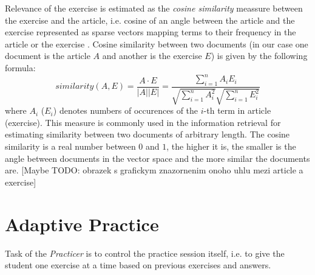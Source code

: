 \documentclass[a4paper, 12pt, twoside]{fithesis2}		%
\renewcommand{\_}{\leavevmode \kern0.07em\vbox{\hrule width0.4em}}
\begin{document}
Relevance of the exercise is estimated as the \textit{cosine similarity} meassure between the exercise and the article,
i.e. cosine of an angle between the article and the exercise represented as sparse vectors mapping terms to their frequency in the article or the exercise
\cite[][121]{information-retrieval}.
Cosine similarity between two documents (in our case one document is the article $A$ and another is the exercise $E$) is given by the following formula:
$$
similarity(A, E)
= \frac{A \cdot E}{|A| |E|}
= \frac{\sum_{i=1}^{n} A_i E_i}{\sqrt{\sum_{i=1}^{n} A_i^2}\sqrt{\sum_{i=1}^{n} E_i^2}}
$$
where $A_i$ ($E_i$) denotes numbers of occurences of the $i$-th term in article (exercise).
This measure is commonly used in the information retrieval for estimating similarity between two documents of arbitrary length. The cosine similarity is a real number between $0$ and $1$, the higher it is, the smaller is the angle between documents in the vector space and the more similar the documents are. [Maybe TODO: obrazek s grafickym znazornenim onoho uhlu mezi article a exercise]


\section{Adaptive Practice}
\label{sec:smartoo-practice}

Task of the \textit{Practicer} is to control the practice session itself, i.e. to give the student one exercise at a time based on previous exercises and answers.
\end{document}
